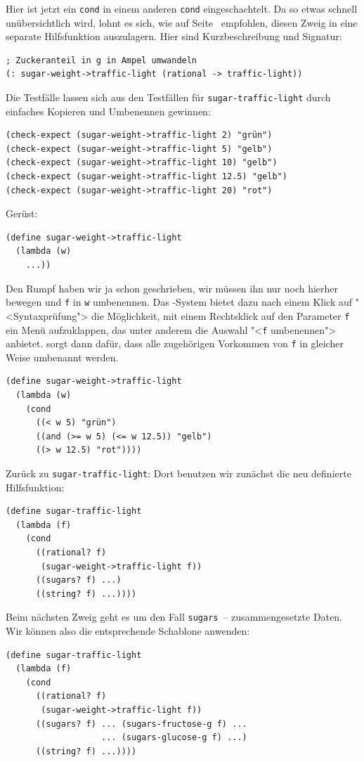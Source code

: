 Hier ist jetzt ein \texttt{cond} in einem anderen \texttt{cond}
eingeschachtelt.  Da so etwas schnell unübersichtlich wird, lohnt es
sich, wie auf Seite~\pageref{page:separate-mixed-procs} empfohlen,
diesen Zweig in eine separate Hilfsfunktion auszulagern.  Hier sind
 Kurzbeschreibung und Signatur:
%
\begin{verbatim}
; Zuckeranteil in g in Ampel umwandeln
(: sugar-weight->traffic-light (rational -> traffic-light))
\end{verbatim}
%
Die Testfälle lassen sich aus den Testfällen für
\texttt{sugar-traffic-light} durch einfaches Kopieren und Umbenennen
gewinnen:
%
\begin{verbatim}
(check-expect (sugar-weight->traffic-light 2) "grün")
(check-expect (sugar-weight->traffic-light 5) "gelb")
(check-expect (sugar-weight->traffic-light 10) "gelb")
(check-expect (sugar-weight->traffic-light 12.5) "gelb")
(check-expect (sugar-weight->traffic-light 20) "rot")
\end{verbatim}
%
Gerüst:
%
\begin{verbatim}
(define sugar-weight->traffic-light
  (lambda (w)
    ...))
\end{verbatim}
%
Den Rumpf haben wir ja schon geschrieben, wir müssen ihn nur noch
hierher bewegen und \texttt{f} in \texttt{w} umbenennen. Das \drscheme{}-System
bietet dazu nach einem Klick auf "<Syntaxprüfung"> die Möglichkeit, mit einem
Rechtsklick auf den Parameter \texttt{f} ein Menü aufzuklappen, das unter
anderem die Auswahl "<\texttt{f} umbenennen"> anbietet. \drscheme{} sorgt dann
dafür, dass alle zugehörigen Vorkommen von \texttt{f} in gleicher Weise
umbenannt werden.
%
\begin{verbatim}
(define sugar-weight->traffic-light
  (lambda (w)
    (cond
      ((< w 5) "grün")
      ((and (>= w 5) (<= w 12.5)) "gelb")
      ((> w 12.5) "rot"))))
\end{verbatim}
%
Zurück zu \texttt{sugar-traffic-light}: Dort benutzen wir zunächst die
neu definierte Hilfsfunktion:
%
\begin{verbatim}
(define sugar-traffic-light
  (lambda (f)
    (cond
      ((rational? f)
       (sugar-weight->traffic-light f))
      ((sugars? f) ...)
      ((string? f) ...))))
\end{verbatim}         
%
Beim nächsten Zweig geht es um den Fall \texttt{sugars}~--
zusammengesetzte Daten.  Wir können also die entsprechende Schablone
anwenden:
%
\begin{verbatim}
(define sugar-traffic-light
  (lambda (f)
    (cond
      ((rational? f)
       (sugar-weight->traffic-light f))
      ((sugars? f) ... (sugars-fructose-g f) ...
                   ... (sugars-glucose-g f) ...)
      ((string? f) ...))))
\end{verbatim}         
